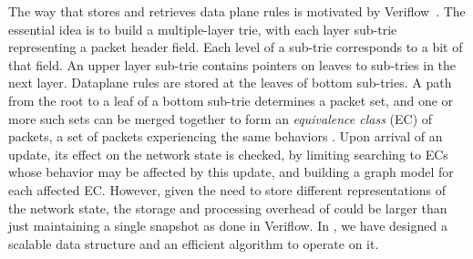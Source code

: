 The way that \name stores and retrieves data plane rules is motivated by Veriflow~\cite{VeriFlow}. 
The essential idea is to build a multiple-layer trie, with each layer sub-trie representing a packet header field. 
Each level of a sub-trie corresponds to a bit of that  field.
An upper layer sub-trie contains pointers on leaves to sub-tries in the next layer. 
Dataplane rules are stored at the leaves of bottom sub-tries.
A path from the root to a leaf of a bottom sub-trie determines a packet set, and one or more such sets can be merged together to form an \emph{equivalence class} (EC) of packets, 
a set of packets experiencing the same behaviors .
Upon arrival of an update, its effect on the network state is checked, by limiting searching to ECs whose behavior may be affected by this update, and building a graph model for each affected EC.
\fi
However, given the need to store different representations of the network state, the storage and processing overhead of \name could be larger than just maintaining a single snapshot as done in Veriflow. 
 In \name, we have designed a scalable data structure and an efficient algorithm to operate on it.


